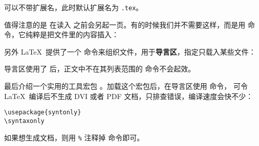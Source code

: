  可以不带扩展名，此时默认扩展名为 \texttt{.tex}。

值得注意的是  在读入  之前会另起一页。有的时候我们并不需要这样，而是用  命令，它纯粹是把文件里的内容插入：
\begin{command}
\end{command}

另外 \LaTeX\ 提供了一个  命令来组织文件，用于\textbf{导言区}，指定只载入某些文件：
\begin{command}
\end{command}

导言区使用了  后，正文中不在其列表范围的  命令不会起效。

最后介绍一个实用的工具宏包 。加载这个宏包后，在导言区使用  命令，
可令 \LaTeX\ 编译后不生成 DVI 或者 PDF 文档，只排查错误，编译速度会快不少：
\begin{verbatim}
\usepackage{syntonly}
\syntaxonly
\end{verbatim}

如果想生成文档，则用 \texttt\% 注释掉  命令即可。

\endinput